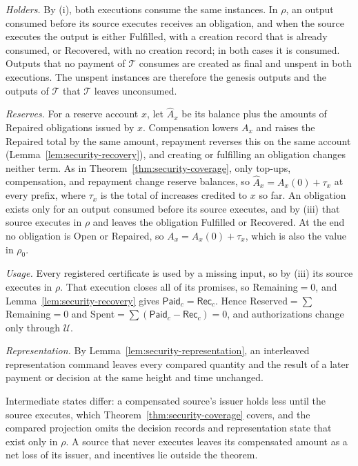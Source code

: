 \begin{IEEEproof}
\emph{Holders.} By (i), both executions consume the same instances. In $\rho$, an output consumed before its source executes receives an obligation, and when the source executes the output is either Fulfilled, with a creation record that is already consumed, or Recovered, with no creation record; in both cases it is consumed. Outputs that no payment of $\mathcal T$ consumes are created as final and unspent in both executions. The unspent instances are therefore the genesis outputs and the outputs of $\mathcal T$ that $\mathcal T$ leaves unconsumed.

\emph{Reserves.} For a reserve account $x$, let $\hat A_x$ be its balance plus the amounts of Repaired obligations issued by $x$. Compensation lowers $A_x$ and raises the Repaired total by the same amount, repayment reverses this on the same account (Lemma~\ref{lem:security-recovery}), and creating or fulfilling an obligation changes neither term. As in Theorem~\ref{thm:security-coverage}, only top-ups, compensation, and repayment change reserve balances, so $\hat A_x=A_x(0)+\tau_x$ at every prefix, where $\tau_x$ is the total of increases credited to $x$ so far. An obligation exists only for an output consumed before its source executes, and by (iii) that source executes in $\rho$ and leaves the obligation Fulfilled or Recovered. At the end no obligation is Open or Repaired, so $A_x=A_x(0)+\tau_x$, which is also the value in $\rho_0$.

\emph{Usage.} Every registered certificate is used by a missing input, so by (iii) its source executes in $\rho$. That execution closes all of its promises, so Remaining$=0$, and Lemma~\ref{lem:security-recovery} gives $\mathsf{Paid}_c=\mathsf{Rec}_c$. Hence Reserved$=\sum$Remaining$=0$ and Spent$=\sum(\mathsf{Paid}_c-\mathsf{Rec}_c)=0$, and authorizations change only through $\mathcal U$.

\emph{Representation.} By Lemma~\ref{lem:security-representation}, an interleaved representation command leaves every compared quantity and the result of a later payment or decision at the same height and time unchanged.
\end{IEEEproof}

Intermediate states differ: a compensated source's issuer holds less until the source executes, which Theorem~\ref{thm:security-coverage} covers, and the compared projection omits the decision records and representation state that exist only in $\rho$. A source that never executes leaves its compensated amount as a net loss of its issuer, and incentives lie outside the theorem.

